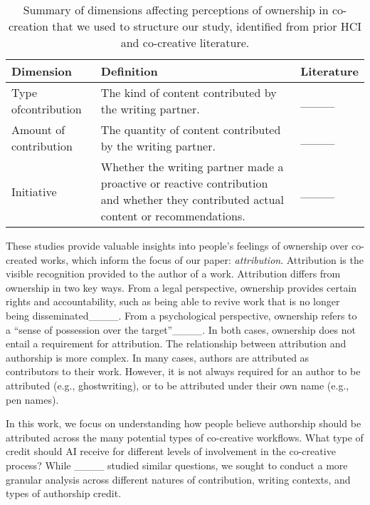 \begin{table}[htp]
    \centering
    \small
    \begin{tabularx}{\linewidth}{p{1.5cm}XX}
        \toprule
        \textbf{Dimension} & \textbf{Definition} & \textbf{Literature} \\
        \midrule
        Type of\newline contribution & The kind of content contributed by the writing partner. & ____ \\
        \midrule
        Amount of contribution & The quantity of content contributed by the writing partner. & ____  \\
        \midrule
        Initiative & Whether the writing partner made a proactive or reactive contribution and whether they contributed actual content or recommendations. & ____  \\
        \bottomrule
    \end{tabularx}
    \caption{Summary of dimensions affecting perceptions of ownership in co-creation that we used to structure our study, identified from prior HCI and co-creative literature.}
    \label{tab:contribution-dimensions}
\end{table}

These studies provide valuable insights into people's feelings of ownership over co-created works, which inform the focus of our paper: \emph{attribution}. Attribution is the visible recognition provided to the author of a work. Attribution differs from ownership in two key ways. From a legal perspective, ownership provides certain rights and accountability, such as being able to revive work that is no longer being disseminated____. From a psychological perspective, ownership refers to a ``sense of possession over the target''____. In both cases, ownership does not entail a requirement for attribution. The relationship between attribution and authorship is more complex. In many cases, authors are attributed as contributors to their work. However, it is not always required for an author to be attributed (e.g., ghostwriting), or to be attributed under their own name (e.g., pen names).

In this work, we focus on understanding how people believe authorship should be attributed across the many potential types of co-creative workflows. What type of credit should AI receive for different levels of involvement in the co-creative process? While ____ studied similar questions, we sought to conduct a more granular analysis across different natures of contribution, writing contexts, and types of authorship credit.

